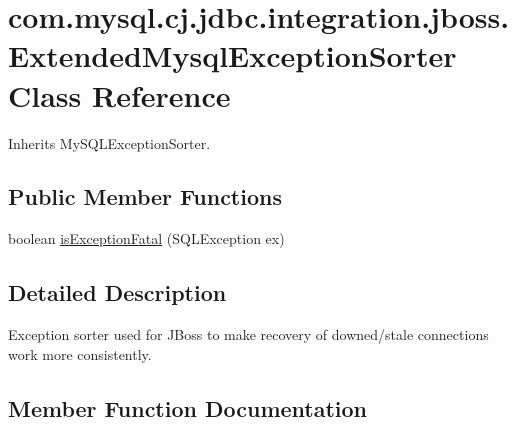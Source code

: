 \hypertarget{classcom_1_1mysql_1_1cj_1_1jdbc_1_1integration_1_1jboss_1_1_extended_mysql_exception_sorter}{}\section{com.\+mysql.\+cj.\+jdbc.\+integration.\+jboss.\+Extended\+Mysql\+Exception\+Sorter Class Reference}
\label{classcom_1_1mysql_1_1cj_1_1jdbc_1_1integration_1_1jboss_1_1_extended_mysql_exception_sorter}


Inherits My\+S\+Q\+L\+Exception\+Sorter.

\subsection*{Public Member Functions}
\begin{DoxyCompactItemize}
\item 
boolean \mbox{\hyperlink{classcom_1_1mysql_1_1cj_1_1jdbc_1_1integration_1_1jboss_1_1_extended_mysql_exception_sorter_a9cfe7633f1e57c781cf615f90b552537}{is\+Exception\+Fatal}} (S\+Q\+L\+Exception ex)
\end{DoxyCompactItemize}


\subsection{Detailed Description}
Exception sorter used for J\+Boss to make recovery of downed/stale connections work more consistently. 

\subsection{Member Function Documentation}
\mbox{\label{classcom_1_1mysql_1_1cj_1_1jdbc_1_1integration_1_1jboss_1_1_extended_mysql_exception_sorter_a9cfe7633f1e57c781cf615f90b552537}} 
